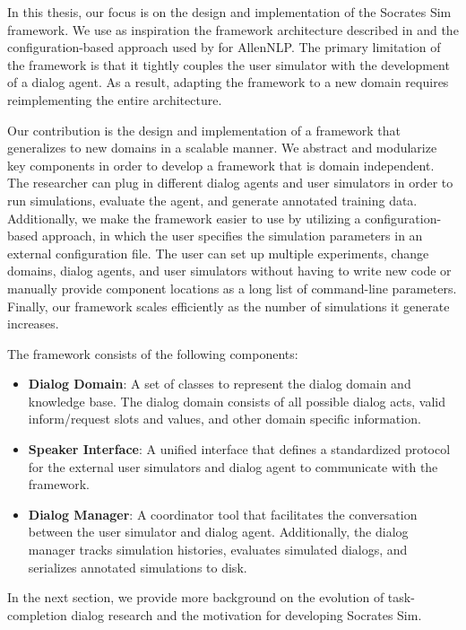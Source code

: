 In this thesis, our focus is on the design and implementation of the Socrates Sim framework. We use as inspiration the framework architecture described in \cite{li_usersim} and the configuration-based approach used by \cite{Gardner_allennlp} for AllenNLP. The primary limitation of the \cite{li_end_to_end} framework is that it tightly couples the user simulator with the development of a dialog agent. As a result, adapting the framework to a new domain requires reimplementing the entire architecture. 

Our contribution is the design and implementation of a framework that generalizes to new domains in a scalable manner. We abstract and modularize key components in order to develop a framework that is domain independent. The researcher can plug in different dialog agents and user simulators in order to run simulations, evaluate the agent, and generate annotated training data. Additionally, we make the framework easier to use by utilizing a configuration-based approach, in which the user specifies the simulation parameters in an external configuration file. The user can set up multiple experiments, change domains, dialog agents, and user simulators without having to write new code or manually provide component locations as a long list of command-line parameters. Finally, our framework scales efficiently as the number of simulations it generate increases. 

The framework consists of the following components:
\begin{itemize}
	\item \textbf{Dialog Domain}: A set of classes to represent the dialog domain and knowledge base. The dialog domain consists of all possible dialog acts, valid inform/request slots and values, and other domain specific information. 
	\item \textbf{Speaker Interface}: A unified interface that defines a standardized protocol for the external user simulators and dialog agent to communicate with the framework. 
	\item \textbf{Dialog Manager}: A coordinator tool that facilitates the conversation between the user simulator and dialog agent. Additionally, the dialog manager tracks simulation histories, evaluates simulated dialogs, and serializes annotated simulations to disk.  
\end{itemize}

In the next section, we provide more background on the evolution of task-completion dialog research and the motivation for developing Socrates Sim. 

